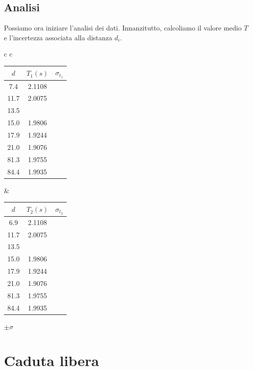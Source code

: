 \subsection{Analisi}
Possiamo ora iniziare l'analisi dei dati. Innanzitutto, calcoliamo il valore medio $T$ e l'incertezza associata alla distanza $d_i$.
\begin{center}
\begin{tabular}{c   c}
\begin{tabular}{c|c|c}
$d$ & $T_1(s)$ & $\sigma_{t_1}$ \\
\midrule
7.4 & 2.1108 &\\
11.7 & 2.0075 &\\
13.5 & &\\
15.0 &  1.9806 &\\
17.9 & 1.9244 &\\
21.0 & 1.9076 &\\
81.3 & 1.9755&\\
84.4 & 1.9935&\\
\end{tabular}
&
\begin{tabular}{c|c|c}
$d$ & $T_2(s)$ & $\sigma_{t_2}$ \\
\midrule
6.9 & 2.1108 &\\
11.7 & 2.0075 &\\
13.5 & &\\
15.0 &  1.9806 &\\
17.9 & 1.9244 &\\
21.0 & 1.9076 &\\
81.3 & 1.9755&\\
84.4 & 1.9935&\\
\end{tabular}
\end{tabular}
\end{center}


$\pm\sigma$

\section{Caduta libera}


